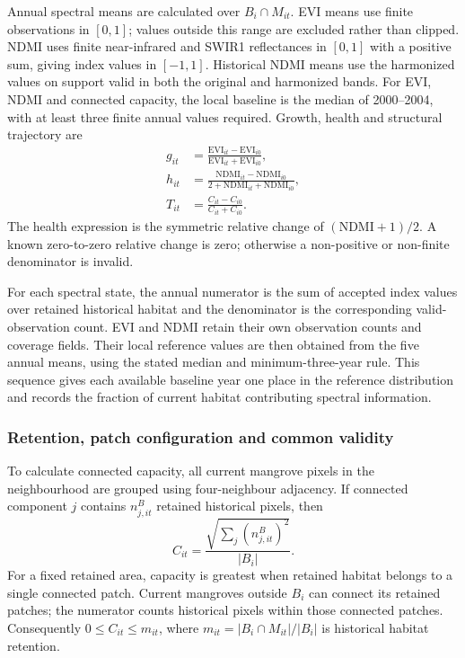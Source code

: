 Annual spectral means are calculated over $B_i\cap M_{it}$. EVI means use finite observations in $[0,1]$; values outside this range are excluded rather than clipped. NDMI uses finite near-infrared and SWIR1 reflectances in $[0,1]$ with a positive sum, giving index values in $[-1,1]$. Historical NDMI means use the harmonized values on support valid in both the original and harmonized bands. For EVI, NDMI and connected capacity, the local baseline is the median of 2000--2004, with at least three finite annual values required. Growth, health and structural trajectory are
\begin{align}
g_{it}&=\frac{\mathrm{EVI}_{it}-\mathrm{EVI}_{i0}}
 {\mathrm{EVI}_{it}+\mathrm{EVI}_{i0}},\label{eq:si_growth}\\
h_{it}&=\frac{\mathrm{NDMI}_{it}-\mathrm{NDMI}_{i0}}
 {2+\mathrm{NDMI}_{it}+\mathrm{NDMI}_{i0}},\label{eq:si_health}\\
T_{it}&=\frac{C_{it}-C_{i0}}{C_{it}+C_{i0}}.\label{eq:si_trajectory}
\end{align}
The health expression is the symmetric relative change of $(\mathrm{NDMI}+1)/2$. A known zero-to-zero relative change is zero; otherwise a non-positive or non-finite denominator is invalid.

For each spectral state, the annual numerator is the sum of accepted index values over retained historical habitat and the denominator is the corresponding valid-observation count. EVI and NDMI retain their own observation counts and coverage fields. Their local reference values are then obtained from the five annual means, using the stated median and minimum-three-year rule. This sequence gives each available baseline year one place in the reference distribution and records the fraction of current habitat contributing spectral information.

\subsubsection{Retention, patch configuration and common validity}

To calculate connected capacity, all current mangrove pixels in the neighbourhood are grouped using four-neighbour adjacency. If connected component $j$ contains $n^B_{j,it}$ retained historical pixels, then
\begin{equation}\label{eq:si_capacity}
C_{it}=\frac{\sqrt{\sum_j(n^B_{j,it})^2}}{|B_i|}.
\end{equation}
For a fixed retained area, capacity is greatest when retained habitat belongs to a single connected patch. Current mangroves outside $B_i$ can connect its retained patches; the numerator counts historical pixels within those connected patches. Consequently $0\leq C_{it}\leq m_{it}$, where $m_{it}=|B_i\cap M_{it}|/|B_i|$ is historical habitat retention.

